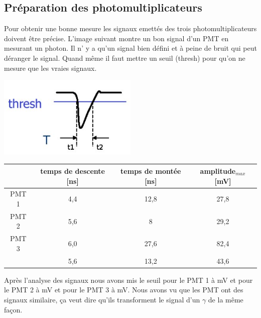 \documentclass[a4paper,11pt,liststotocnumbered,bibtotocnumbered]{scrartcl}
\begin{document}
  \subsection{Préparation des photomultiplicateurs}
   Pour obtenir une bonne mesure les signaux emettés des trois photomultiplicateurs doivent être précise. L'image suivant montre un bon signal d'un PMT en mesurant un photon. Il n' y a qu'un signal bien défini et à peine de bruit qui peut déranger le signal. Quand même il faut mettre un seuil (thresh) pour qu'on ne mesure que les vraies signaux.  
   \begin{center}
    \includegraphics[width=0.5\textwidth]{bilder/pmtpuls.jpg}
   \end{center}
  \begin{tabular}{c|c|c|c}
      &temps de descente [ns]	&temps de montée [ns]	&amplitude$_{max}$ [mV]\\
    \hline
PMT 1	&	4,4	&	12,8	&	27,8	\\
PMT 2	&	5,6	&	8	&	29,2	\\
PMT 3	&	6,0	&	27,6	&	82,4	\\
	&	5,6	&	13,2	&	43,6	\\
   \end{tabular}
\newline

 Après l'analyse des signaux nous avons mis le seuil pour le PMT 1 à \unit[19]{mV} et pour le PMT 2 à \unit[25]{mV} et pour le PMT 3 à \unit[24]{mV}. Nous avons vu que les PMT ont des signaux similaire, \c ca veut dire qu'ils transforment le signal d'un $\gamma$ de la même fa\c con.
\end{document}
